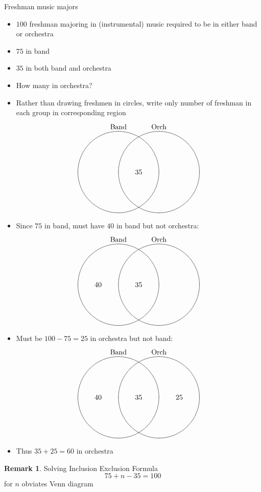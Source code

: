 \documentclass[handout]{beamer}
\theoremstyle{definition}
\newtheorem{remark}{Remark}
\begin{document}
\begin{frame}{Freshman music majors}
\begin{itemize}
\item $100$ freshman majoring in (instrumental) music
required to be in either band or orchestra
\item $75$ in band
\item $35$ in both band and orchestra
\item How many in orchestra?
\item Rather than drawing freshmen in circles,
write only \alert{number} of freshman in each
group in corresponding region 
\[\begin{xy}<1cm,0cm>:
(-1,2)*+!D{\text{Band}};
(1,2)*+!D{\text{Orch}};
(-1,0)*\cir<2cm>{};
(1,0)*\cir<2cm>{};
(0,0)*{35};
\end{xy}\]
\end{itemize}
\end{frame}

\begin{frame}
\begin{itemize}
\item Since $75$ in band, must have
$40$ in band but not orchestra:
\[\begin{xy}<1cm,0cm>:
(-1,2)*+!D{\text{Band}};
(1,2)*+!D{\text{Orch}};
(-1,0)*\cir<2cm>{};
(1,0)*\cir<2cm>{};
(0,0)*{35};
(-2,0)*{40};
\end{xy}\]
\end{itemize}
\end{frame}

\begin{frame}
\begin{itemize}
\item Must be $100-75=25$ in orchestra but not band:
\[\begin{xy}<1cm,0cm>:
(-1,2)*+!D{\text{Band}};
(1,2)*+!D{\text{Orch}};
(-1,0)*\cir<2cm>{};
(1,0)*\cir<2cm>{};
(0,0)*{35};
(-2,0)*{40};
(2,0)*{25};
\end{xy}\]
\item Thus $35+25=60$ in orchestra
\end{itemize}
\begin{remark}
Solving Inclusion Exclusion Formula
\[75+n-35=100\]
for $n$ obviates Venn diagram
\end{remark}
\end{frame}
\end{document}
